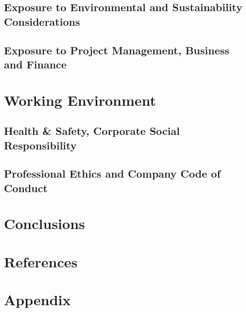 \documentclass{article}[12pt]
\begin{document}
\subsection{Exposure to Environmental and Sustainability Considerations}
\subsection{Exposure to Project Management, Business and Finance}

\clearpage
\section{Working Environment}
\subsection{Health \& Safety, Corporate Social Responsibility}
\subsection{Professional Ethics and Company Code of Conduct}

\clearpage
\section{Conclusions}

\clearpage
{}
\section*{References}

\clearpage
{}
\section*{Appendix}
\end{document}
